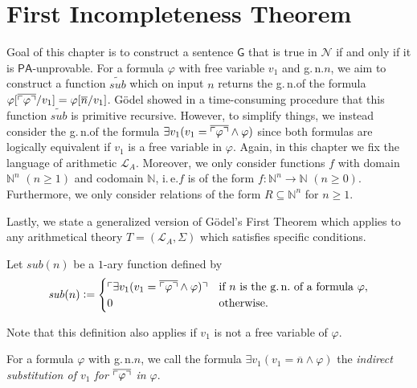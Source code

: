 \chapter{First Incompleteness Theorem}\label{chap:firstIncomp}
Goal of this chapter is to construct a sentence $\mathsf{G}$ that is true in $\mathcal{N}$ if and only if it is $\mathsf{PA}$-unprovable. For a formula $\varphi$ with free variable $v_1$ and g.\,n.\@ $n$, we aim to construct a function $\widetilde{\mathit{sub}}$ which on input $n$ returns the g.\,n.\@ of the formula $\varphi[\overline{\ulcorner \varphi \urcorner} / v_1] = \varphi[\overline{n}/ v_1]$. G\"odel showed in a time-consuming procedure that this function $\widetilde{\mathit{sub}}$ is primitive recursive. However, to simplify things, we instead consider the g.\,n.\@ of the formula $\exists v_1  ( v_1 = \overline{\ulcorner \varphi \urcorner} \wedge \varphi )$ since both formulas are logically equivalent if $v_1$ is a free variable in $\varphi$. Again, in this chapter we fix the language of arithmetic $\mathcal{L}_A$. Moreover, we only consider functions $f$ with domain $\mathbb{N}^n$ $(n \ge 1)$ and codomain $\mathbb{N}$, i.\,e.\@ $f$ is of the form $f: \mathbb{N}^n \rightarrow \mathbb{N}$ $(n\ge 0)$. Furthermore, we only consider relations of the form $R\subseteq \mathbb{N}^n$ for $n \ge 1$. 

Lastly, we state a generalized version of G\"odel's First Theorem which applies to any arithmetical theory $T=(\mathcal{L}_A, \Sigma)$ which satisfies specific conditions.

\begin{dfn}
Let $\mathit{sub}(n)$ be a $1$-ary function defined by
\[ \mathit{sub}(n) \defeq \begin{cases} 
\upl \exists v_1  ( v_1 = \overline{\upl \varphi \upr} \wedge \varphi ) \upr & \text{if }n \text{ is the g.\,n.\@ of a formula } \varphi, \\
0 & \text{otherwise}.
\end{cases} 
\]\end{dfn}

Note that this definition also applies if $v_1$ is not a free variable of $\varphi$.

For a formula $\varphi$ with g.\,n.\@ $n$, we call the formula $\exists v_1 (v_1 = \overline{n} \wedge \varphi)$ the \textit{indirect substitution of $v_1$ for $\overline{\ulcorner\varphi \urcorner}$ in $\varphi$}.
 
